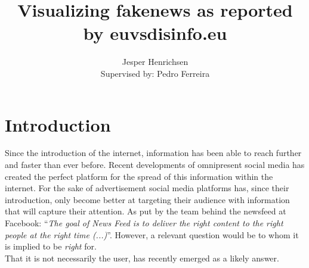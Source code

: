\documentclass{article}
\title{Visualizing fakenews as reported by euvsdisinfo.eu}
\author{Jesper Henrichsen \\{\small Supervised by: Pedro Ferreira}}
\begin{document}
\maketitle
\newpage
\tableofcontents
\newpage

\section{Introduction}
Since the introduction of the internet, information has been able to reach further and faster than ever before. Recent developments of omnipresent social media has created the perfect platform for the spread of this information within the internet. For the sake of advertisement social media platforms has, since their introduction, only become better at targeting their audience with information that will capture their attention. As put by the team behind the newsfeed at Facebook: ``{\it The goal of News Feed is to deliver the right content to the right people at the right time (...)}''. However, a relevant question would be to whom it is implied to be {\it right} for.
\\ That it is not necessarily the user, has recently emerged as a likely answer.   
\end{document}
